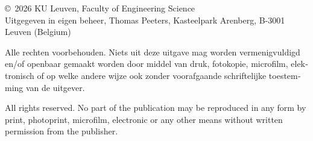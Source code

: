 \thispagestyle{empty}
\vspace*{\fill}
{\small\noindent\copyright\ 2026 KU Leuven, Faculty of Engineering Science\\
Uitgegeven in eigen beheer, Thomas Peeters, Kasteelpark Arenberg, B-3001 Leuven (Belgium)\par
\vspace{0.8em}
\begin{otherlanguage}{dutch}
\noindent Alle rechten voorbehouden. Niets uit deze uitgave mag worden vermenigvuldigd en/of
openbaar gemaakt worden door middel van druk, fotokopie, microfilm, elektronisch of op welke
andere wijze ook zonder voorafgaande schriftelijke toestemming van de uitgever.\par
\end{otherlanguage}
\vspace{0.8em}
\noindent All rights reserved. No part of the publication may be reproduced in any form by print,
photoprint, microfilm, electronic or any other means without written permission from the
publisher.\par}
\clearpage
